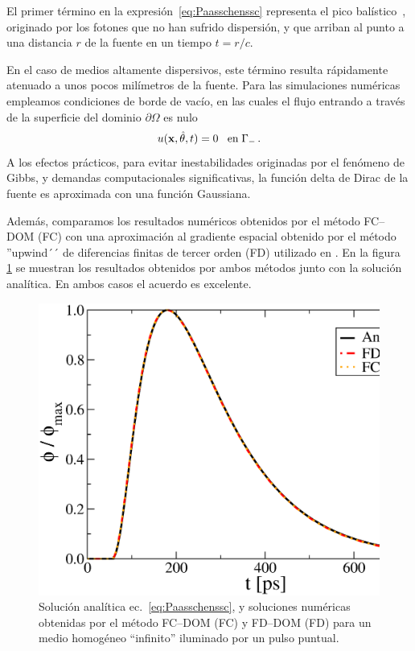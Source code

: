 El primer término en la expresión~\eqref{eq:Paasschenssc} 
representa el pico balístico~\cite{Paasschens1997}, originado 
por los fotones que no han sufrido dispersión, y que arriban al punto 
a una distancia $r$ de la fuente en un tiempo $t=r/c$.

En el caso de medios altamente dispersivos, este término resulta rápidamente atenuado 
a unos pocos milímetros de la fuente. Para las simulaciones numéricas 
empleamos condiciones de borde de vacío, en las cuales el flujo 
entrando a través de la superficie del dominio $\partial \Omega$ es nulo 
\begin{equation}
u(\mathbf{x},\hat{\theta},t)=0 \;\;\; \text{en}\; \Gamma_{-} \, .
\label{eq:vacuumbc}
\end{equation}
A los efectos prácticos, para evitar inestabilidades originadas 
por el fenómeno de Gibbs, y demandas computacionales significativas, 
la función delta de Dirac de la fuente es aproximada con una función Gaussiana.

Además, comparamos los resultados numéricos obtenidos por el método FC--DOM (FC)
con una aproximación al gradiente espacial obtenido por el método ''upwind´´ 
de diferencias finitas de tercer orden (FD) utilizado en \cite{Fujii2014}. 
En la figura~ \ref{fig:analytic1} se muestran los resultados obtenidos por ambos métodos 
junto con la solución analítica. En ambos casos el acuerdo es excelente.

 \begin{figure}[h]
\centering
  \includegraphics[width=0.48\linewidth]{figuras/analytic1.eps}
  \caption{Solución analítica ec.~\eqref{eq:Paasschenssc}, 
  y soluciones numéricas obtenidas por el método FC--DOM (FC) 
  y FD--DOM (FD) para un medio homogéneo ``infinito'' iluminado 
  por un pulso puntual.}
 \label{fig:analytic1}
\end{figure}
 
